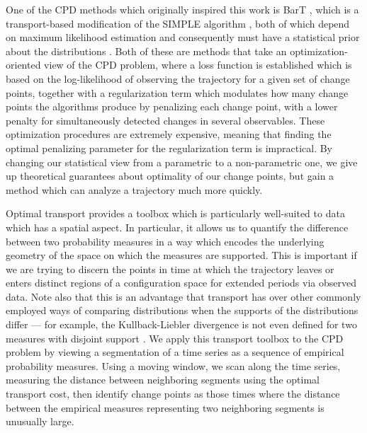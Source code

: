 \documentclass{article}
\begin{document}
One of the CPD methods which originally inspired this work is BarT \cite{damjanovicModelingChangesMolecular2023}, which is a transport-based modification of the SIMPLE algorithm \cite{IdentifyingLocalizedChanges}, both of which depend on maximum likelihood estimation \cite{wassermanAllStatisticsConcise2004} and consequently must have a statistical prior about the distributions \cite{IdentifyingLocalizedChanges} \cite{damjanovicModelingChangesMolecular2023}. Both of these are methods that take an optimization-oriented view of the CPD problem, where a loss function is established which is based on the log-likelihood of observing the trajectory for a given set of change points, together with a regularization term which modulates how many change points the algorithms produce by penalizing each change point, with a lower penalty for simultaneously detected changes in several observables. These optimization procedures are extremely expensive, meaning that finding the optimal penalizing parameter for the regularization term is impractical. By changing our statistical view from a parametric to a non-parametric one, we give up theoretical guarantees about optimality of our change points, but gain a method which can analyze a trajectory much more quickly.

Optimal transport provides a toolbox which is particularly well-suited to data which has a spatial aspect. In particular, it allows us to quantify the difference between two probability measures in a way which encodes the underlying geometry of the space on which the measures are supported. This is important if we are trying to discern the points in time at which the trajectory leaves or enters distinct regions of a configuration space for extended periods via observed data. Note also that this is an advantage that transport has over other commonly employed ways of comparing distributions when the supports of the distributions differ --- for example, the Kullback-Liebler divergence is not even defined for two measures with disjoint support \cite{wassermanAllStatisticsConcise2004}. We apply this transport toolbox to the CPD problem by viewing a segmentation of a time series as a sequence of empirical probability measures. Using a moving window, we scan along the time series, measuring the distance between neighboring segments using the optimal transport cost, then identify change points as those times where the distance between the empirical measures representing two neighboring segments is unusually large.
\end{document}
